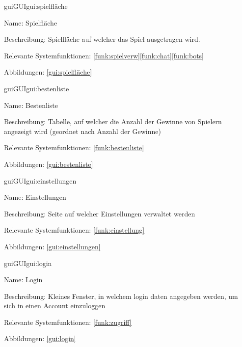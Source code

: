 \begin{description}[leftmargin=5em, style=sameline]	
	\begin{lhp}{gui}{GUI}{gui:spielfläche}
		\item[Name:] Spielfläche
		\item[Beschreibung:] Spielfläche auf welcher das Spiel ausgetragen wird.
		\item[Relevante Systemfunktionen:] \ref{funk:spielverw}\ref{funk:chat}\ref{funk:bots}
		\item[Abbildungen:] \ref{gui:spielfläche}
	\end{lhp}
\end{description}

\begin{description}[leftmargin=5em, style=sameline]	
	\begin{lhp}{gui}{GUI}{gui:bestenliste}
		\item[Name:] Bestenliste
		\item[Beschreibung:] Tabelle, auf welcher die Anzahl der Gewinne von Spielern angezeigt wird (geordnet nach Anzahl der Gewinne)
		\item[Relevante Systemfunktionen:] \ref{funk:bestenliste}
		\item[Abbildungen:] \ref{gui:bestenliste}
	\end{lhp}
\end{description}

\begin{description}[leftmargin=5em, style=sameline]	
	\begin{lhp}{gui}{GUI}{gui:einstellungen}
		\item[Name:] Einstellungen
		\item[Beschreibung:] Seite auf welcher Einstellungen verwaltet werden
		\item[Relevante Systemfunktionen:] \ref{funk:einstellung}
		\item[Abbildungen:] \ref{gui:einstellungen}
	\end{lhp}
\end{description}

\begin{description}[leftmargin=5em, style=sameline]	
	\begin{lhp}{gui}{GUI}{gui:login}
		\item[Name:] Login
		\item[Beschreibung:] Kleines Fenster, in welchem login daten angegeben werden, um sich in einen Account einzuloggen
		\item[Relevante Systemfunktionen:] \ref{funk:zugriff}
		\item[Abbildungen:] \ref{gui:login}
	\end{lhp}
\end{description}

